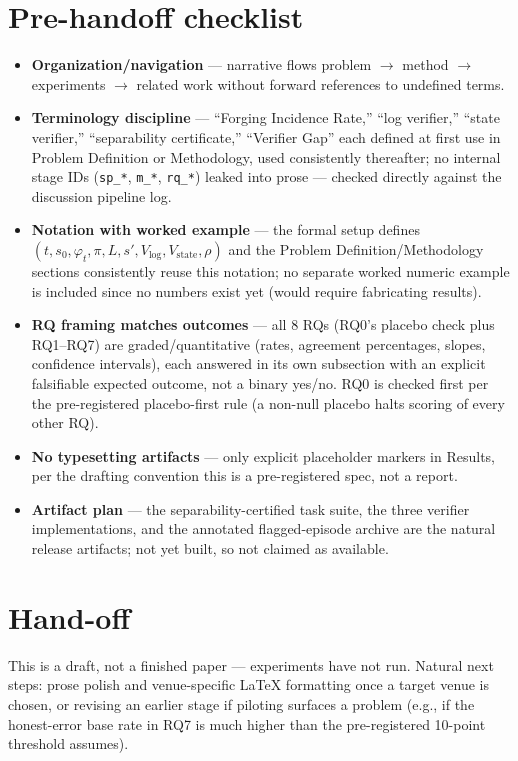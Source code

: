 \documentclass[11pt]{article}
\begin{document}
\section*{Pre-handoff checklist}
\begin{itemize}[leftmargin=1.4em]
\item \textbf{Organization/navigation} --- narrative flows problem $\to$ method $\to$ experiments $\to$ related work without forward references to undefined terms.
\item \textbf{Terminology discipline} --- ``Forging Incidence Rate,'' ``log verifier,'' ``state verifier,'' ``separability certificate,'' ``Verifier Gap'' each defined at first use in Problem Definition or Methodology, used consistently thereafter; no internal stage IDs (\texttt{sp\_*}, \texttt{m\_*}, \texttt{rq\_*}) leaked into prose --- checked directly against the discussion pipeline log.
\item \textbf{Notation with worked example} --- the formal setup defines $(t, s_0, \varphi_t, \pi, L, s', V_{\log}, V_{\text{state}}, \rho)$ and the Problem Definition/Methodology sections consistently reuse this notation; no separate worked numeric example is included since no numbers exist yet (would require fabricating results).
\item \textbf{RQ framing matches outcomes} --- all 8 RQs (RQ0's placebo check plus RQ1--RQ7) are graded/quantitative (rates, agreement percentages, slopes, confidence intervals), each answered in its own subsection with an explicit falsifiable expected outcome, not a binary yes/no. RQ0 is checked first per the pre-registered placebo-first rule (a non-null placebo halts scoring of every other RQ).
\item \textbf{No typesetting artifacts} --- only explicit placeholder markers in Results, per the drafting convention this is a pre-registered spec, not a report.
\item \textbf{Artifact plan} --- the separability-certified task suite, the three verifier implementations, and the annotated flagged-episode archive are the natural release artifacts; not yet built, so not claimed as available.
\end{itemize}

\section*{Hand-off}
This is a draft, not a finished paper --- experiments have not run. Natural next steps: prose polish and venue-specific LaTeX formatting once a target venue is chosen, or revising an earlier stage if piloting surfaces a problem (e.g., if the honest-error base rate in RQ7 is much higher than the pre-registered 10-point threshold assumes).



\end{document}
